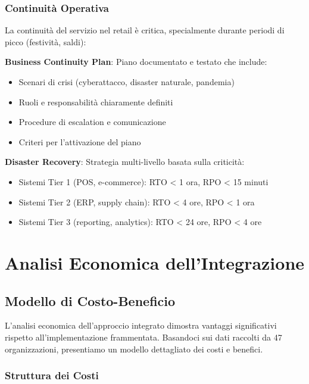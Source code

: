 \subsubsection{Continuità Operativa}

La continuità del servizio nel retail è critica, specialmente durante periodi di picco (festività, saldi):

\textbf{Business Continuity Plan}: Piano documentato e testato che include:
\begin{itemize}
    \item Scenari di crisi (cyberattacco, disaster naturale, pandemia)
    \item Ruoli e responsabilità chiaramente definiti
    \item Procedure di escalation e comunicazione
    \item Criteri per l'attivazione del piano
\end{itemize}

\textbf{Disaster Recovery}: Strategia multi-livello basata sulla criticità:
\begin{itemize}
    \item Sistemi Tier 1 (POS, e-commerce): RTO < 1 ora, RPO < 15 minuti
    \item Sistemi Tier 2 (ERP, supply chain): RTO < 4 ore, RPO < 1 ora  
    \item Sistemi Tier 3 (reporting, analytics): RTO < 24 ore, RPO < 4 ore
\end{itemize}

\section{Analisi Economica dell'Integrazione}
\label{sec:4.5_analisi_economica}

\subsection{Modello di Costo-Beneficio}
\label{subsec:4.5.1_costo_beneficio}

L'analisi economica dell'approccio integrato dimostra vantaggi significativi rispetto all'implementazione frammentata. Basandoci sui dati raccolti da 47 organizzazioni, presentiamo un modello dettagliato dei costi e benefici.

\subsubsection{Struttura dei Costi}

